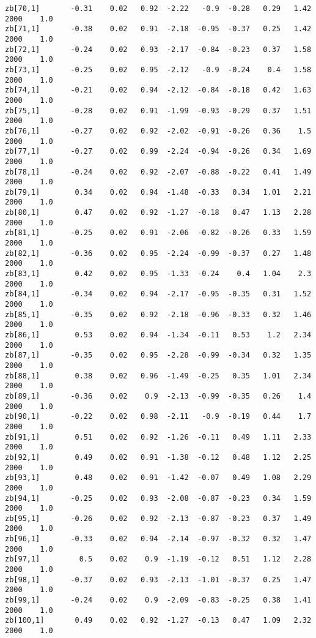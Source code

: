 \documentclass[11pt]{article}
\begin{document}
\begin{Verbatim}[commandchars=\\\{\}]
zb[70,1]       -0.31    0.02   0.92  -2.22   -0.9  -0.28   0.29   1.42   2000    1.0
zb[71,1]       -0.38    0.02   0.91  -2.18  -0.95  -0.37   0.25   1.42   2000    1.0
zb[72,1]       -0.24    0.02   0.93  -2.17  -0.84  -0.23   0.37   1.58   2000    1.0
zb[73,1]       -0.25    0.02   0.95  -2.12   -0.9  -0.24    0.4   1.58   2000    1.0
zb[74,1]       -0.21    0.02   0.94  -2.12  -0.84  -0.18   0.42   1.63   2000    1.0
zb[75,1]       -0.28    0.02   0.91  -1.99  -0.93  -0.29   0.37   1.51   2000    1.0
zb[76,1]       -0.27    0.02   0.92  -2.02  -0.91  -0.26   0.36    1.5   2000    1.0
zb[77,1]       -0.27    0.02   0.99  -2.24  -0.94  -0.26   0.34   1.69   2000    1.0
zb[78,1]       -0.24    0.02   0.92  -2.07  -0.88  -0.22   0.41   1.49   2000    1.0
zb[79,1]        0.34    0.02   0.94  -1.48  -0.33   0.34   1.01   2.21   2000    1.0
zb[80,1]        0.47    0.02   0.92  -1.27  -0.18   0.47   1.13   2.28   2000    1.0
zb[81,1]       -0.25    0.02   0.91  -2.06  -0.82  -0.26   0.33   1.59   2000    1.0
zb[82,1]       -0.36    0.02   0.95  -2.24  -0.99  -0.37   0.27   1.48   2000    1.0
zb[83,1]        0.42    0.02   0.95  -1.33  -0.24    0.4   1.04    2.3   2000    1.0
zb[84,1]       -0.34    0.02   0.94  -2.17  -0.95  -0.35   0.31   1.52   2000    1.0
zb[85,1]       -0.35    0.02   0.92  -2.18  -0.96  -0.33   0.32   1.46   2000    1.0
zb[86,1]        0.53    0.02   0.94  -1.34  -0.11   0.53    1.2   2.34   2000    1.0
zb[87,1]       -0.35    0.02   0.95  -2.28  -0.99  -0.34   0.32   1.35   2000    1.0
zb[88,1]        0.38    0.02   0.96  -1.49  -0.25   0.35   1.01   2.34   2000    1.0
zb[89,1]       -0.36    0.02    0.9  -2.13  -0.99  -0.35   0.26    1.4   2000    1.0
zb[90,1]       -0.22    0.02   0.98  -2.11   -0.9  -0.19   0.44    1.7   2000    1.0
zb[91,1]        0.51    0.02   0.92  -1.26  -0.11   0.49   1.11   2.33   2000    1.0
zb[92,1]        0.49    0.02   0.91  -1.38  -0.12   0.48   1.12   2.25   2000    1.0
zb[93,1]        0.48    0.02   0.91  -1.42  -0.07   0.49   1.08   2.29   2000    1.0
zb[94,1]       -0.25    0.02   0.93  -2.08  -0.87  -0.23   0.34   1.59   2000    1.0
zb[95,1]       -0.26    0.02   0.92  -2.13  -0.87  -0.23   0.37   1.49   2000    1.0
zb[96,1]       -0.33    0.02   0.94  -2.14  -0.97  -0.32   0.32   1.47   2000    1.0
zb[97,1]         0.5    0.02    0.9  -1.19  -0.12   0.51   1.12   2.28   2000    1.0
zb[98,1]       -0.37    0.02   0.93  -2.13  -1.01  -0.37   0.25   1.47   2000    1.0
zb[99,1]       -0.24    0.02    0.9  -2.09  -0.83  -0.25   0.38   1.41   2000    1.0
zb[100,1]       0.49    0.02   0.92  -1.27  -0.13   0.47   1.09   2.32   2000    1.0

\end{Verbatim}
\end{document}
